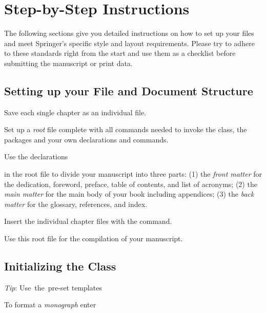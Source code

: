 \documentclass[graybox]{svmono}
\begin{document}
\section{ Step-by-Step Instructions}

The following sections give you detailed instructions on how to set up your files and meet Springer's specific style and layout requirements. Please try to adhere to these standards right from the start and use them as a checklist before submitting the manuscript or print data.

\subsection{ Setting up your File and Document Structure}

Save each single chapter as an individual file.

Set up a {\it root} file complete with all commands needed to invoke the class, the packages and your own declarations and commands.

Use the declarations
\cprotect{}


in the root file to divide your manuscript into three parts: (1) the {\it front matter}
for the dedication, foreword, preface, table of contents, and list of acronyms; (2)
the {\it main matter} for the main body of your book including appendices; (3) the
{\it back matter} for the glossary, references, and index.

Insert the individual chapter files with the \verb|| command.

Use this root file for the compilation of your manuscript.


\subsection{Initializing the Class}

\hspace*{29pc}\hbox{{\it Tip}:}
\hspace*{29pc}\hbox{Use the pre-set}
\hspace*{29pc}\hbox{templates}


\vspace*{-4.5pc}

To format a {\it monograph} enter
\end{document}
